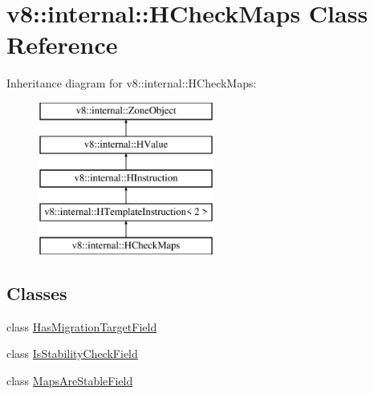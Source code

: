 \hypertarget{classv8_1_1internal_1_1_h_check_maps}{}\section{v8\+:\+:internal\+:\+:H\+Check\+Maps Class Reference}
\label{classv8_1_1internal_1_1_h_check_maps}
Inheritance diagram for v8\+:\+:internal\+:\+:H\+Check\+Maps\+:\begin{figure}[H]
\begin{center}
\leavevmode
\includegraphics[height=5.000000cm]{classv8_1_1internal_1_1_h_check_maps}
\end{center}
\end{figure}
\subsection*{Classes}
\begin{DoxyCompactItemize}
\item 
class \hyperlink{classv8_1_1internal_1_1_h_check_maps_1_1_has_migration_target_field}{Has\+Migration\+Target\+Field}
\item 
class \hyperlink{classv8_1_1internal_1_1_h_check_maps_1_1_is_stability_check_field}{Is\+Stability\+Check\+Field}
\item 
class \hyperlink{classv8_1_1internal_1_1_h_check_maps_1_1_maps_are_stable_field}{Maps\+Are\+Stable\+Field}
\end{DoxyCompactItemize}

